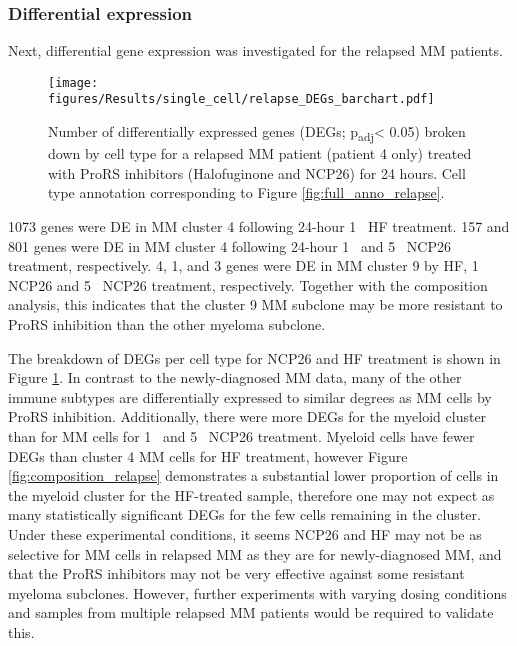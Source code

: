 \subsubsection{Differential expression}
Next, differential gene expression was investigated for the relapsed MM patients.
%
\begin{figure}[htb]
\centering
\texttt{[image: figures/Results/single\_cell/relapse\_DEGs\_barchart.pdf]}
\caption[scRNA-seq DEGs per cell type- relapsed MM]{Number of differentially expressed genes (DEGs; p\textsubscript{adj}< 0.05) broken down by cell type for a relapsed MM patient (patient 4 only) treated with ProRS inhibitors (Halofuginone and NCP26) for 24 hours.
Cell type annotation corresponding to Figure \ref{fig:full_anno_relapse}.}
\label{fig:relapse_deg_bar}
\end{figure}
%
1073 genes were DE in MM cluster 4 following 24-hour 1\si{\micro\Molar} HF treatment.
157 and 801 genes were DE in MM cluster 4 following 24-hour 1\si{\micro\Molar}  and 5\si{\micro\Molar} NCP26 treatment, respectively.
4, 1, and 3 genes were DE in MM cluster 9 by HF, 1\si{\micro\Molar} NCP26  and 5\si{\micro\Molar} NCP26 treatment, respectively.
Together with the composition analysis, this indicates that the cluster 9 MM subclone may be more resistant to ProRS inhibition than the other myeloma subclone.

The breakdown of DEGs per cell type for NCP26 and HF treatment is shown in Figure \ref{fig:relapse_deg_bar}.
In contrast to the newly-diagnosed MM data, many of the other immune subtypes are differentially expressed to similar degrees as MM cells by ProRS inhibition.
Additionally, there were more DEGs for the myeloid cluster than for MM cells for 1\si{\micro\Molar} and 5\si{\micro\Molar}  NCP26 treatment.
Myeloid cells have fewer DEGs than cluster 4 MM cells for HF treatment, however Figure \ref{fig:composition_relapse} demonstrates a substantial lower proportion of cells in the myeloid cluster for the HF-treated sample, therefore one may not expect as many statistically significant DEGs for the few cells remaining in the cluster.
Under these experimental conditions, it seems NCP26 and HF may not be as selective for MM cells in relapsed MM as they are for newly-diagnosed MM, and that the ProRS inhibitors may not be very effective against some resistant myeloma subclones.
However, further experiments with varying dosing conditions and samples from multiple relapsed MM patients would be required to validate this.

